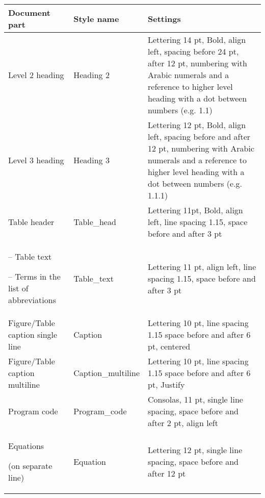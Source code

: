 \begin{table}[!ht]
  \centering
  \begin{tabular}{|L{3.7cm}|L{3.0cm}|L{7.2cm}|}
    \hline
    \textbf{Document part} & \textbf{Style name} & \textbf{Settings}\\  \hline

    Level 2 heading & Heading 2 & Lettering 14 pt, Bold, align left, spacing before
                                  24 pt, after 12 pt, numbering with Arabic
                                  numerals and a reference to higher level
                                  heading with a dot between numbers (e.g. 1.1) \\ \hline
    Level 3 heading & Heading 3 &Lettering 12 pt, Bold, align left, spacing before
                                  and after 12 pt, numbering with Arabic
                                  numerals and a reference to higher level
                                  heading with a dot between numbers
                                  (e.g. 1.1.1) \\ \hline
    Table header &Table\_head & Lettering 11pt, Bold, align left, line spacing
                                1.15, space before and after 3 pt \\ \hline

    -- Table text

    -- Terms in the list of
    abbreviations & Table\_text & Lettering 11 pt, align left, line spacing 1.15,
                                  space before and after 3 pt \\ \hline

    Figure/Table caption
    single line & Caption & Lettering 10 pt, line spacing 1.15
                            space before and after 6 pt, centered \\ \hline

    Figure/Table caption
    multiline & Caption\_multiline & Lettering 10 pt, line spacing 1.15
                                     space before and after 6 pt, Justify \\ \hline

    Program code & Program\_code & Consolas, 11 pt, single line spacing,
                                   space before and after 2 pt, align left \\ \hline

    Equations

    (on separate line) & Equation & Lettering 12 pt, single line spacing, space before and after 12 pt \\ \hline


\end{tabular}
\end{table}
